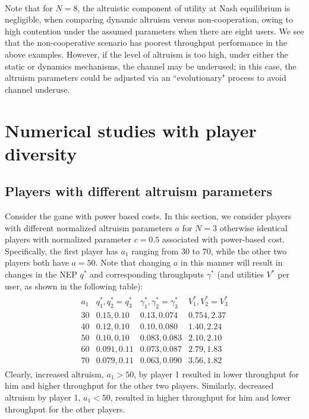 \documentclass[12pt,onecolumn,draftcls]{IEEEtran}
\newcommand{\beqa}{\begin{eqnarray*}}
\newcommand{\eeqa}{\end{eqnarray*}}
\begin{document}
~\\
Note that for $N=8$, the altruistic component of utility at Nash
equilibrium is negligible, when comparing dynamic altruism versus
non-cooperation, owing to high contention under the assumed parameters when
there are eight users. We see that the non-cooperative scenario has poorest
throughput performance in the above examples. However, if the level of
altruism is too high, under either the static or dynamics mechanisms, the
channel may be underused; in this case, the altruism parameters could
be adjusted via an ``evolutionary" process to avoid channel
underuse.





\section{Numerical studies with player diversity}\label{num-sec-diversity}



\subsection{Players with different altruism parameters}



Consider the game with power based costs.
In this section, we consider players with different normalized altruism
parameters $a$ 
for $N=3$ otherwise identical players with normalized
parameter $c=0.5$ associated with power-based cost.  Specifically, the
first player has  $a_1$ ranging from 30 to 70, while the other two players
both have $a=50$. Note that changing $a$ in this manner will result in changes
in the NEP $q^*$ and  corresponding throughputs $\gamma^*$ (and utilities
$V^*$ per user, as shown in the following table):
\beqa
\begin{array}{c|c|c|c}
a_1 & q_1^*,q_2^*=q_3^*  & \gamma^*_1,\gamma^*_2=\gamma^*_3 & 
V^*_1, V_2^*=V_3^*  \\ \hline
30 &  0.15,0.10 &  0.13,0.074   & 0.754,2.37 \\ 
40 & 0.12,0.10 & 0.10,0.080  &  1.40, 2.24\\ 
50 & 0.10,0.10 & 0.083,0.083   & 2.10,2.10  \\ 
60 &  0.091,0.11 & 0.073,0.087  &  2.79, 1.83\\ 
70 & 0.079,0.11 & 0.063,0.090   & 3.56, 1.82
\end{array}
\eeqa
Clearly, increased altruism, $a_1>50$, by player 1 resulted in lower
throughput  for him and higher throughput for the other two players.
Similarly, decreased altruism by player 1, $a_1<50$, resulted in higher
throughput for him and lower throughput for the other players.
\end{document}
